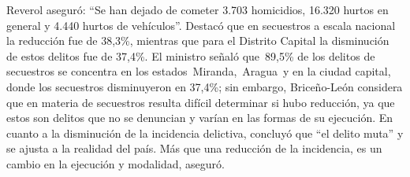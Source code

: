 \documentclass{article}%
\begin{document}
\newline%
%
Reverol aseguró: “Se han dejado de cometer 3.703 homicidios, 16.320 hurtos en general y 4.440 hurtos de vehículos”. Destacó que en secuestros a escala nacional la reducción fue de 38,3\%, mientras que para el Distrito Capital la disminución de estos delitos fue de 37,4\%.%
\newline%
%
El ministro señaló que~89,5\% de los delitos de secuestros se concentra en los estados~Miranda,~Aragua~y en la ciudad capital, donde los secuestros disminuyeron en 37,4\%; sin embargo, Briceño{-}León considera que en materia de secuestros resulta difícil determinar si hubo reducción, ya que estos son delitos que no se denuncian y varían en las formas de su ejecución.%
\newline%
%
En cuanto a la disminución de la incidencia delictiva, concluyó que “el delito muta” y se ajusta a la realidad del país. Más que una reducción de la incidencia, es un cambio en la ejecución y modalidad, aseguró.%
\newline%
%
\end{document}
